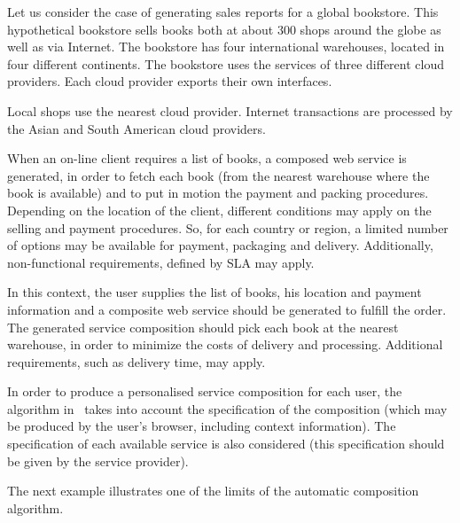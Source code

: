\begin{example}\label{Ex:rew1}
Let us consider the case of generating sales reports for a global bookstore.
This hypothetical bookstore sells books both at about 300 shops around the globe as well as via Internet.
The bookstore has four international warehouses, located in four different continents.
The bookstore uses the services of three different cloud providers.
Each cloud provider exports their own interfaces.

Local shops use the nearest cloud provider.
Internet transactions are processed by the Asian and South American cloud providers.

When an on-line client requires a list of books, a composed web service is generated, in order to fetch each book (from the nearest warehouse where the book is available) and to put in motion the payment and packing procedures.
Depending on the location of the client, different conditions may apply on the selling and payment procedures.
So, for each country or region, a limited number of options may be available for payment, packaging and delivery.
Additionally, non-functional requirements, defined by SLA may apply.

In this context, the user supplies the list of books, his location and payment information and a composite web service should be generated to fulfill the order.
The generated service composition should pick each book at the nearest warehouse, in order to minimize the costs of delivery and processing.
Additional requirements, such as delivery time, may apply.

In order to produce a personalised service composition for each user, the algorithm in~\cite{CostaAMR13} takes into account the specification of the composition (which may be produced by the user's browser, including context information).
The specification of each available service is also considered (this specification should be given by the service provider).
~\hfill\openbox
\end{example}

The next example illustrates one of the limits of the automatic composition algorithm.

